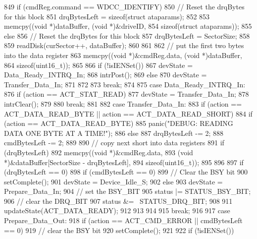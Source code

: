 \begin{DoxyCode}
{{{849             if (cmdReg.command == WDCC_IDENTIFY) {
850                 // Reset the drqBytes for this block
851                 drqBytesLeft = sizeof(struct ataparams);
852 
853                 memcpy((void *)dataBuffer, (void *)&driveID,
854                        sizeof(struct ataparams));
855             } else {
856                 // Reset the drqBytes for this block
857                 drqBytesLeft = SectorSize;
858 
859                 readDisk(curSector++, dataBuffer);
860             }
861 
862             // put the first two bytes into the data register
863             memcpy((void *)&cmdReg.data, (void *)dataBuffer,
864                    sizeof(uint16_t));
865 
866             if (!isIENSet()) {
867                 devState = Data_Ready_INTRQ_In;
868                 intrPost();
869             } else {
870                 devState = Transfer_Data_In;
871             }
872         }
873         break;
874 
875       case Data_Ready_INTRQ_In:
876         if (action == ACT_STAT_READ) {
877             devState = Transfer_Data_In;
878             intrClear();
879         }
880         break;
881 
882       case Transfer_Data_In:
883         if (action == ACT_DATA_READ_BYTE || action == ACT_DATA_READ_SHORT) {
884             if (action == ACT_DATA_READ_BYTE) {
885                 panic("DEBUG: READING DATA ONE BYTE AT A TIME!\n");
886             } else {
887                 drqBytesLeft -= 2;
888                 cmdBytesLeft -= 2;
889 
890                 // copy next short into data registers
891                 if (drqBytesLeft)
892                     memcpy((void *)&cmdReg.data,
893                            (void *)&dataBuffer[SectorSize - drqBytesLeft],
894                            sizeof(uint16_t));
895             }
896 
897             if (drqBytesLeft == 0) {
898                 if (cmdBytesLeft == 0) {
899                     // Clear the BSY bit
900                     setComplete();
901                     devState = Device_Idle_S;
902                 } else {
903                     devState = Prepare_Data_In;
904                     // set the BSY_BIT
905                     status |= STATUS_BSY_BIT;
906                     // clear the DRQ_BIT
907                     status &= ~STATUS_DRQ_BIT;
908 
911                     updateState(ACT_DATA_READY);
912                 }
913             }
914         }
915         break;
916 
917       case Prepare_Data_Out:
918         if (action == ACT_CMD_ERROR || cmdBytesLeft == 0) {
919             // clear the BSY bit
920             setComplete();
921 
922             if (!isIENSet()) {
}}}}
\end{DoxyCode}
